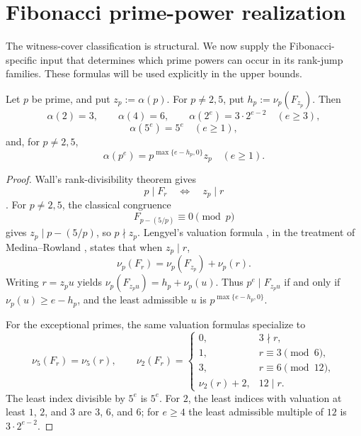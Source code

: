\section{Fibonacci prime-power realization}
\label{sec:prime-power-realization}

The witness-cover classification is structural.  We now supply the
Fibonacci-specific input that determines which prime powers can occur in its
rank-jump families.  These formulas will be used explicitly in the upper bounds.

\begin{proposition}
\label{prop:prime-power-ladders}
Let $p$ be prime, and put $z_p:=\alpha(p)$. For $p\ne2,5$, put
$h_p:=\nu_p(F_{z_p})$. Then
\[
\alpha(2)=3,\qquad \alpha(4)=6,\qquad
\alpha(2^e)=3\cdot2^{e-2}\quad(e\ge3),
\]
\[
\alpha(5^e)=5^e\quad(e\ge1),
\]
and, for $p\ne2,5$,
\[
\alpha(p^e)=p^{\max\{e-h_p,0\}}z_p\quad(e\ge1).
\]
\end{proposition}

\begin{proof}
Wall's rank-divisibility theorem gives
\[
p\mid F_r\quad\Longleftrightarrow\quad z_p\mid r
\]
\cite{Wall1960FibonacciModm}. For $p\ne2,5$, the classical congruence
\[
F_{p-(5/p)}\equiv0\pmod p
\]
gives $z_p\mid p-(5/p)$, so $p\nmid z_p$. Lengyel's valuation formula
\cite[Theorems~1 and~2]{Lengyel1995OrderFibonacciLucas}, in the treatment of
Medina--Rowland \cite{MedinaRowland2015PRegularity}, states that when
$z_p\mid r$,
\[
\nu_p(F_r)=\nu_p(F_{z_p})+\nu_p(r).
\]
Writing $r=z_pu$ yields
$\nu_p(F_{z_pu})=h_p+\nu_p(u)$. Thus $p^e\mid F_{z_pu}$ if and only if
$\nu_p(u)\ge e-h_p$, and the least admissible $u$ is
$p^{\max\{e-h_p,0\}}$.

For the exceptional primes, the same valuation formulas specialize to
\[
\nu_5(F_r)=\nu_5(r),
\qquad
\nu_2(F_r)=
\begin{cases}
0, & 3\nmid r,\\
1, & r\equiv3\pmod 6,\\
3, & r\equiv6\pmod {12},\\
\nu_2(r)+2, & 12\mid r.
\end{cases}
\]
The least index divisible by $5^e$ is $5^e$. For $2$, the least indices
with valuation at least $1$, $2$, and $3$ are $3$, $6$, and $6$; for
$e\ge4$ the least admissible multiple of $12$ is $3\cdot2^{e-2}$.
\end{proof}

